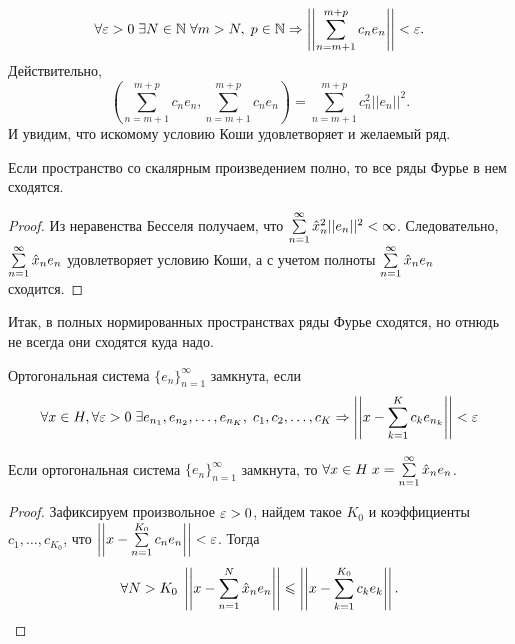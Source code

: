 $$
    \forall \varepsilon>0\; \exists N\in \mathbb{N}\; \forall m>N,\; p\in \mathbb{N} \Rightarrow \left|\left|\sum\limits_{n=m+1}^{m+p}c_ne_n \right|\right| < \varepsilon.
$$
Действительно,
$$
    \left(\sum\limits_{n=m+1}^{m+p}c_ne_n, \sum\limits_{n=m+1}^{m+p}c_ne_n\right) =  \sum\limits_{n=m+1}^{m+p}c_n^2 ||e_n||^2.
$$
И увидим, что искомому условию Коши удовлетворяет и желаемый ряд.
\begin{Consequence}
    Если пространство со скалярным произведением полно, то все ряды Фурье в нем сходятся.
\end{Consequence}
\begin{proof}
    Из неравенства Бесселя получаем, что
    $\sum\limits_{n=1}^{\infty} \hat{x}_n^2 ||e_n||^2 < \infty$. Следовательно, $ \sum\limits_{n=1}^{\infty} \hat{x}_ne_n 
    $ удовлетворяет условию Коши, а с учетом полноты $\sum\limits_{n=1}^{\infty}\hat{x}_n e_n$ сходится.
\end{proof}
Итак, в полных нормированных пространствах ряды Фурье сходятся, но отнюдь не всегда они сходятся куда надо.
\begin{Def}
    Ортогональная система $\{e_n\}_{n=1}^{\infty}$ замкнута, если 
    $$\forall x\in H, \forall \varepsilon >0\; \exists e_{n_1}, e_{n_2}, \ldots, e_{n_K},\; c_1, c_2, \ldots, c_K \Rightarrow \left|\left|x - \sum\limits_{k=1}^{K} c_k e_{n_k}\right|\right|<\varepsilon
    $$
\end{Def}
\begin{Statement}
    Если ортогональная система $\{e_n\}_{n=1}^{\infty}$ замкнута, то $\forall x\in H\; x = \sum\limits_{n=1}^{\infty}\hat{x}_n e_{n}$.
\end{Statement}
\begin{proof}
    Зафиксируем произвольное $\varepsilon >0$, найдем такое $K_0$ и коэффициенты $c_1, \ldots, c_{K_0}$, что $\left|\left| x - \sum\limits_{n=1}^{K_0} c_ne_n \right|\right| < \varepsilon$. Тогда
    $$
        \forall N>K_0 \; \left|\left|x - \sum\limits_{n=1}^{N}\hat{x}_ne_n\right|\right|\leqslant \left|\left|x - \sum\limits_{k=1}^{K_0}c_ke_k \right|\right|.
    $$
\end{proof}
